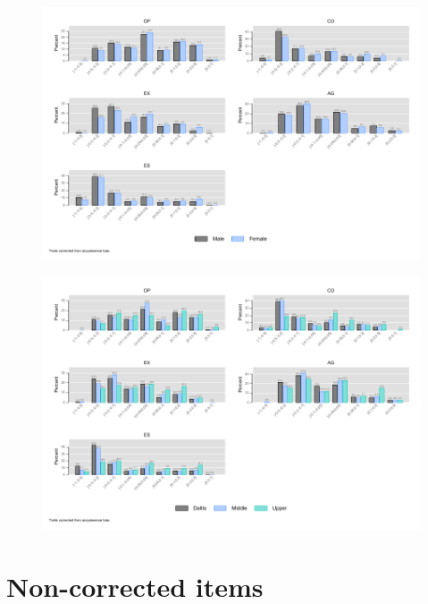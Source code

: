 \documentclass[a4paper, 12pt, onecolumn]{article}
\begin{document}
\begin{figure}[!h]
\raggedright
\includegraphics[scale=0.8]{INPUT/diff_gender_cor}
\caption{}
\label{fig:diffgendercor}
\end{figure}

\begin{figure}[!h]
\raggedright
\includegraphics[scale=0.8]{INPUT/diff_caste_cor}
\caption{}
\label{fig:diffcastecor}
\end{figure}



\clearpage
\newpage
\section{Non-corrected items}
\end{document}
